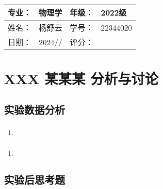 \documentclass[dvipsnames, svgnames,a4paper,11pt]{article}
\begin{document}
	
	
	\clearpage
	
	\begin{table}
		\renewcommand\arraystretch{1.7}
		\begin{tabularx}{\textwidth}{|X|X|X|X|}
			\hline
			专业：& 物理学 &年级：& 2022级\\
			\hline
			姓名： & 杨舒云 & 学号：& 22344020\\
			\hline
			日期：& 2024// & 评分： &\\
			\hline
		\end{tabularx}
	\end{table}
	
	\section{XXX 某某某 \quad\heiti 分析与讨论}
	
	\subsection{实验数据分析}
	
	\subsubsection{}
	\begin{enumerate}
		\item 
	\end{enumerate}
	
	\subsubsection{}
	\begin{enumerate}
		\item 
	\end{enumerate}
	
	\subsubsection{}
	
	
	\subsection{实验后思考题}
	
	\begin{question}
		
	\end{question}
	
\end{document}
